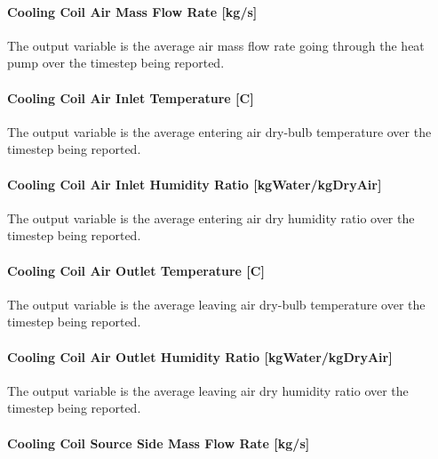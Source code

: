 \paragraph{Cooling Coil Air Mass Flow Rate {[}kg/s{]}}\label{cooling-coil-air-mass-flow-rate-kgs-1}

The output variable is the average air mass flow rate going through the heat pump over the timestep being reported.

\paragraph{Cooling Coil Air Inlet Temperature {[}C{]}}\label{cooling-coil-air-inlet-temperature-c-1}

The output variable is the average entering air dry-bulb temperature over the timestep being reported.

\paragraph{Cooling Coil Air Inlet Humidity Ratio {[}kgWater/kgDryAir{]}}\label{cooling-coil-air-inlet-humidity-ratio-kgwaterkgdryair-1}

The output variable is the average entering air dry humidity ratio over the timestep being reported.

\paragraph{Cooling Coil Air Outlet Temperature {[}C{]}}\label{cooling-coil-air-outlet-temperature-c-1}

The output variable is the average leaving air dry-bulb temperature over the timestep being reported.

\paragraph{Cooling Coil Air Outlet Humidity Ratio {[}kgWater/kgDryAir{]}}\label{cooling-coil-air-outlet-humidity-ratio-kgwaterkgdryair-1}

The output variable is the average leaving air dry humidity ratio over the timestep being reported.

\paragraph{Cooling Coil Source Side Mass Flow Rate {[}kg/s{]}}\label{cooling-coil-source-side-mass-flow-rate-kgs}

